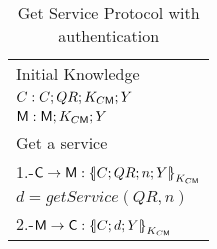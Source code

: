 \begin{table}[htb]
\footnotesize
\begin{center}
\caption{Get Service Protocol with authentication}
\label{table:ProtGetServicesAuth}
\begin{tabular}{|l|}
\hline
           Initial Knowledge                                                             \\
            $C:C; QR ;  K_{C\textsf{M}} ; Y$                                    \\
            $\textsf{M}: \textsf{M}; K_{C\textsf{M}} ; Y$    \\ \hline \hline 
           Get a service                                                                        \\
           1.-$\Client\rightarrow \Server: \fat{C \lnk QR \lnk n \lnk Y}_{K_{C\Server}}$          \\ 
           \hspace{5mm} $d=getService(QR,n)$                                  \\  
           2.-$\Server\rightarrow \Client: \fat{C \lnk d \lnk Y}_{K_{C\Server}}$       \\  \hline \hline
\end{tabular}
\end{center}
\end{table}
\normalsize


